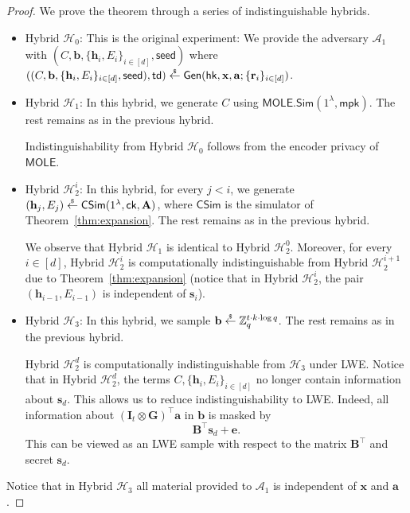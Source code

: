 \documentclass{theoretics}
\newcommand{\td}{\mathsf{td}}
\newcommand{\MOLE}{\mathsf{MOLE}}
\newcommand{\getsr}{\overset{\raisebox{-1pt}{$\scriptscriptstyle \$$}}{\gets}}
\newcommand{\sample}{\getsr}
\newcommand{\Z}{\mathbb{Z}}
\renewcommand{\sec}{\ensuremath{\lambda}}
\newcommand{\Sim}{\mathsf{Sim}}
\newcommand{\Adv}{\mathcal{A}}
\newcommand{\ck}{\mathsf{ck}}
\newcommand{\algofont}[1]{\ensuremath{\mathsf{#1}}}
\newcommand{\Gen}{{\algofont{Gen}}}
\newcommand{\id}{\ensuremath{\mathbf{I}}}
\newcommand{\mpk}{\mathsf{mpk}}
\newcommand{\hk}{\ensuremath{\mathsf{hk}}}
\newcommand{\thmref}[1]{Theorem~\ref{thm:#1}}
\newcommand\bbbone{1}
\begin{document}
\begin{proof}

We prove the theorem through a series of indistinguishable hybrids.
\begin{itemize}
\item Hybrid ${\mathcal{H}_0}$: This is the original experiment: We provide the adversary $\Adv_1$ with $(C, \mathbf{b}, \{\mathbf{h}_i, E_i\}_{i\in[d]}, \mathsf{seed})$ where $((C, \mathbf{b}, \{\mathbf{h}_i, E_i\}_{i\in[d]}, \mathsf{seed}), \td)\sample\Gen(\hk, \mathbf{x}, \mathbf{a}; \{\mathbf{r}_i\}_{i\in[d]})$.

\item Hybrid ${\mathcal{H}_1}$: In this hybrid, we generate $C$ using $\MOLE.\Sim(\bbbone^\sec, \mpk)$. The rest remains as in the previous hybrid.

Indistinguishability from Hybrid ${\mathcal{H}_0}$ follows from the encoder privacy of $\MOLE$.


\item Hybrid ${\mathcal{H}_{2}^i}$: In this hybrid, for every $j<i$, we generate $(\mathbf{h}_j, E_j)\sample\mathsf{C}\Sim(\bbbone^\sec, \ck, \mathbf{A})$, where $\mathsf{C}\Sim$ is the simulator of \thmref{expansion}. The rest remains as in the previous hybrid.

We observe that Hybrid ${\mathcal{H}_1}$ is identical to Hybrid ${\mathcal{H}_2^0}$. Moreover, for every $i\in[d]$, Hybrid ${\mathcal{H}_2^i}$ is computationally indistinguishable from Hybrid ${\mathcal{H}_2^{i+1}}$ due to \thmref{expansion} (notice that in Hybrid ${\mathcal{H}_2^i}$, the pair $(\mathbf{h}_{i-1}, E_{i-1})$ is independent of $\mathbf{s}_i$).

\item Hybrid ${\mathcal{H}_3}$: In this hybrid, we sample $\mathbf{b}\sample\Z_q^{t\cdot k\cdot \log q}$. The rest remains as in the previous hybrid.

Hybrid ${\mathcal{H}_2^{d}}$ is computationally indistinguishable from ${\mathcal{H}_3}$ under LWE. Notice that in Hybrid ${\mathcal{H}_2^{d}}$, the terms $C, \{\mathbf{h}_i, E_i\}_{i\in[d]}$ no longer contain information about $\mathbf{s}_d$. This allows us to reduce indistinguishability to LWE. Indeed, all information about $(\id_t\otimes \mathbf{G})^\intercal\mathbf{a}$ in $\mathbf{b}$ is masked by
\[ \mathbf{B}^\intercal \mathbf{s}_d+\mathbf e. \]
This can be viewed as an LWE sample with respect to the matrix ${\mathbf{B}}^\intercal$ and secret $\mathbf{s}_d$.
\end{itemize}
Notice that in Hybrid ${\mathcal{H}_3}$ all material provided to $\Adv_1$ is independent of $\mathbf{x}$ and $\mathbf{a}$.
\end{proof}
\end{document}
